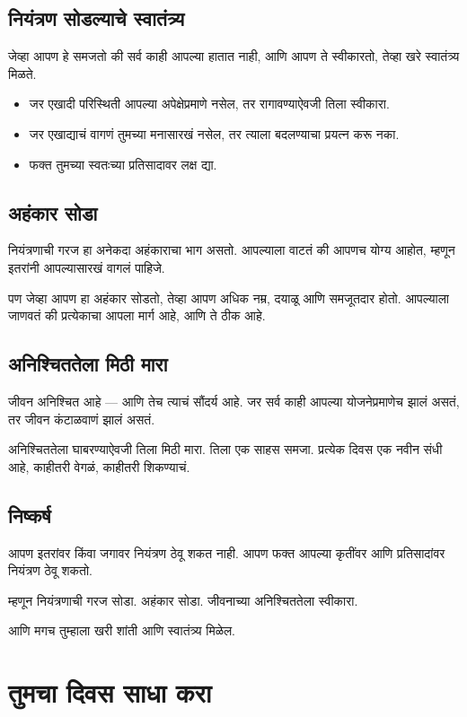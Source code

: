 \section*{नियंत्रण सोडल्याचे स्वातंत्र्य}
जेव्हा आपण हे समजतो की सर्व काही आपल्या हातात नाही,  
आणि आपण ते स्वीकारतो,  
तेव्हा खरे स्वातंत्र्य मिळते.  

\begin{itemize}
\item जर एखादी परिस्थिती आपल्या अपेक्षेप्रमाणे नसेल, तर रागावण्याऐवजी तिला स्वीकारा.  
\item जर एखाद्याचं वागणं तुमच्या मनासारखं नसेल, तर त्याला बदलण्याचा प्रयत्न करू नका.  
\item फक्त तुमच्या स्वतःच्या प्रतिसादावर लक्ष द्या.  
\end{itemize}

\section*{अहंकार सोडा}
नियंत्रणाची गरज हा अनेकदा अहंकाराचा भाग असतो.  
आपल्याला वाटतं की आपणच योग्य आहोत,  
म्हणून इतरांनी आपल्यासारखं वागलं पाहिजे.  

पण जेव्हा आपण हा अहंकार सोडतो,  
तेव्हा आपण अधिक नम्र, दयाळू आणि समजूतदार होतो.  
आपल्याला जाणवतं की प्रत्येकाचा आपला मार्ग आहे,  
आणि ते ठीक आहे.  

\section*{अनिश्चिततेला मिठी मारा}
जीवन अनिश्चित आहे — आणि तेच त्याचं सौंदर्य आहे.  
जर सर्व काही आपल्या योजनेप्रमाणेच झालं असतं,  
तर जीवन कंटाळवाणं झालं असतं.  

अनिश्चिततेला घाबरण्याऐवजी तिला मिठी मारा.  
तिला एक साहस समजा.  
प्रत्येक दिवस एक नवीन संधी आहे,  
काहीतरी वेगळं, काहीतरी शिकण्याचं.  

\section*{निष्कर्ष}
आपण इतरांवर किंवा जगावर नियंत्रण ठेवू शकत नाही.  
आपण फक्त आपल्या कृतींवर आणि प्रतिसादांवर नियंत्रण ठेवू शकतो.  

म्हणून नियंत्रणाची गरज सोडा.  
अहंकार सोडा.  
जीवनाच्या अनिश्चिततेला स्वीकारा.  

आणि मगच तुम्हाला खरी शांती आणि स्वातंत्र्य मिळेल.  



\chapter{तुमचा दिवस साधा करा}

